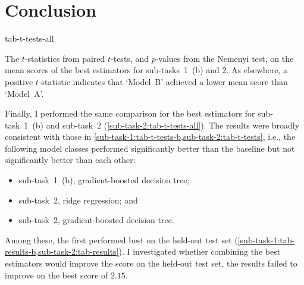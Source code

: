 \section{Conclusion}
\label{sec:conclusion}

\begin{table}
  \centering
  {tab-t-tests-all}
  \caption{
    The $t$-statistics from paired $t$-tests, and $p$-values from the Nemenyi test, on
    the mean scores of the best estimators for sub-tasks~1~(b) and 2.
    As elsewhere, a positive $t$-statistic indicates that `Model~B' achieved a lower mean
    score than `Model~A'.
  }
  \label{sub-task-2:tab-t-tests-all}
\end{table}

Finally, I performed the same comparison for the best estimators for sub-task~1~(b) and
sub-task~2 (\cref{sub-task-2:tab-t-tests-all}).
The results were broadly consistent with those in
\cref{sub-task-1:tab-t-tests-b,sub-task-2:tab-t-tests}, i.e., the following model classes
performed significantly better than the baseline but not significantly better than
each other:
\begin{itemize}
  \item sub-task~1~(b), gradient-boosted decision tree;
  \item sub-task~2, ridge regression; and
  \item sub-task~2, gradient-boosted decision tree.
\end{itemize}
Among these, the first performed best on the held-out test set
(\cref{sub-task-1:tab-results-b,sub-task-2:tab-results}).
I investigated whether combining the best estimators would improve the score on the
held-out test set, the results failed to improve on the best score of $2.15$.

